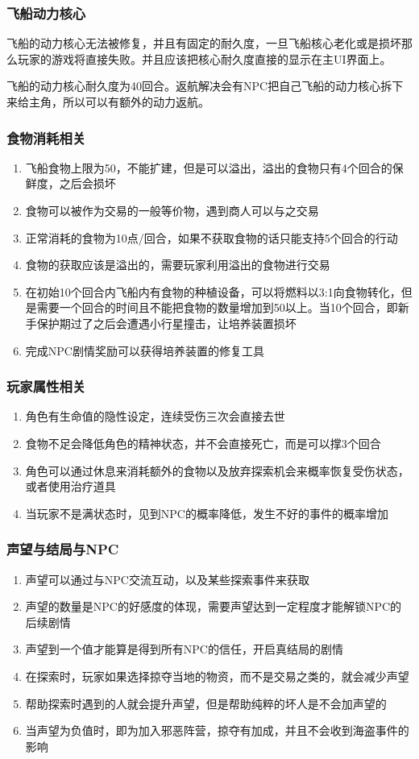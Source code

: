 \documentclass{ctexart}
\begin{document}
		\subsubsection{飞船动力核心}
		飞船的动力核心无法被修复，并且有固定的耐久度，一旦飞船核心老化或是损坏那么玩家的游戏将直接失败。并且应该把核心耐久度直接的显示在主UI界面上。
		
		飞船的动力核心耐久度为40回合。返航解决会有NPC把自己飞船的动力核心拆下来给主角，所以可以有额外的动力返航。
		\subsubsection{食物消耗相关}
		\begin{enumerate}
			\item 飞船食物上限为50，不能扩建，但是可以溢出，溢出的食物只有4个回合的保鲜度，之后会损坏
			\item 食物可以被作为交易的一般等价物，遇到商人可以与之交易
			\item 正常消耗的食物为10点/回合，如果不获取食物的话只能支持5个回合的行动
			\item 食物的获取应该是溢出的，需要玩家利用溢出的食物进行交易
			\item 在初始10个回合内飞船内有食物的种植设备，可以将燃料以3:1向食物转化，但是需要一个回合的时间且不能把食物的数量增加到50以上。当10个回合，即新手保护期过了之后会遭遇小行星撞击，让培养装置损坏
			\item 完成NPC剧情奖励可以获得培养装置的修复工具
		\end{enumerate}
		\subsubsection{玩家属性相关}
			\begin{enumerate}
				\item 角色有生命值的隐性设定，连续受伤三次会直接去世
				\item 食物不足会降低角色的精神状态，并不会直接死亡，而是可以撑3个回合
				\item 角色可以通过休息来消耗额外的食物以及放弃探索机会来概率恢复受伤状态，或者使用治疗道具
				\item 当玩家不是满状态时，见到NPC的概率降低，发生不好的事件的概率增加
			\end{enumerate}
		\subsubsection{声望与结局与NPC}
			\begin{enumerate}
				\item 声望可以通过与NPC交流互动，以及某些探索事件来获取
				\item 声望的数量是NPC的好感度的体现，需要声望达到一定程度才能解锁NPC的后续剧情
				\item 声望到一个值才能算是得到所有NPC的信任，开启真结局的剧情
				\item 在探索时，玩家如果选择掠夺当地的物资，而不是交易之类的，就会减少声望
				\item 帮助探索时遇到的人就会提升声望，但是帮助纯粹的坏人是不会加声望的
				\item 当声望为负值时，即为加入邪恶阵营，掠夺有加成，并且不会收到海盗事件的影响
			\end{enumerate}
\end{document}
